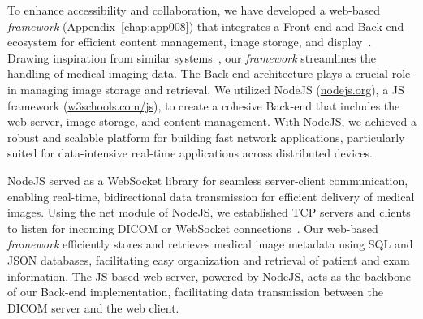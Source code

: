 To enhance accessibility and collaboration, we have developed a web-based {\it framework} (Appendix~\ref{chap:app008}) that integrates a Front-end and Back-end ecosystem for efficient content management, image storage, and display~\cite{WO2022071818A1, 10.1145/3399715.3399744}.
Drawing inspiration from similar systems~\cite{HOSTETTER2018811}, our {\it framework} streamlines the handling of medical imaging data.
The Back-end architecture plays a crucial role in managing image storage and retrieval.
We utilized NodeJS (\href{https://nodejs.org/en}{nodejs.org}), a \acf{JS} framework (\href{https://www.w3schools.com/js/}{w3schools.com/js}), to create a cohesive Back-end that includes the web server, image storage, and content management.
With NodeJS, we achieved a robust and scalable platform for building fast network applications, particularly suited for data-intensive real-time applications across distributed devices.

NodeJS served as a WebSocket library for seamless server-client communication, enabling real-time, bidirectional data transmission for efficient delivery of medical images.
Using the net module of NodeJS, we established \ac{TCP} servers and clients to listen for incoming \ac{DICOM} or WebSocket connections~\cite{WO2022071818A1}.
Our web-based {\it framework} efficiently stores and retrieves medical image metadata using \ac{SQL} and \ac{JSON} databases, facilitating easy organization and retrieval of patient and exam information.
The \ac{JS}-based web server, powered by NodeJS, acts as the backbone of our Back-end implementation, facilitating data transmission between the \ac{DICOM} server and the web client.